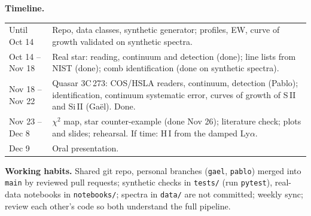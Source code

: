 \documentclass[10pt,a4paper]{article}
\begin{document}
\textbf{Timeline.}\par
\begin{tabular}{@{}p{2.5cm}p{14.2cm}@{}}
\toprule
Until Oct 14 & Repo, data classes, synthetic generator; profiles, EW, curve of growth validated on synthetic spectra.\\
Oct 14 -- Nov 18 & Real star: reading, continuum and detection (done); line lists from NIST (done); comb identification (done on synthetic spectra).\\
Nov 18 -- Nov 22 & Quasar 3C\,273: COS/HSLA readers, continuum, detection (Pablo); identification, continuum systematic error, curves of growth of S\,II and Si\,II (Gaël). Done.\\
Nov 23 -- Dec 8 & $\chi^2$ map, star counter-example (done Nov 26); literature check; plots and slides; rehearsal. If time: H\,I from the damped Ly$\alpha$.\\
Dec 9 & Oral presentation.\\
\bottomrule
\end{tabular}

\textbf{Working habits.} Shared git repo, personal branches (\texttt{gael}, \texttt{pablo}) merged into \texttt{main} by reviewed pull requests; synthetic checks in \texttt{tests/} (run \texttt{pytest}), real-data notebooks in \texttt{notebooks/}; spectra in \texttt{data/} are not committed; weekly sync; review each other's code so both understand the full pipeline.
\end{document}
